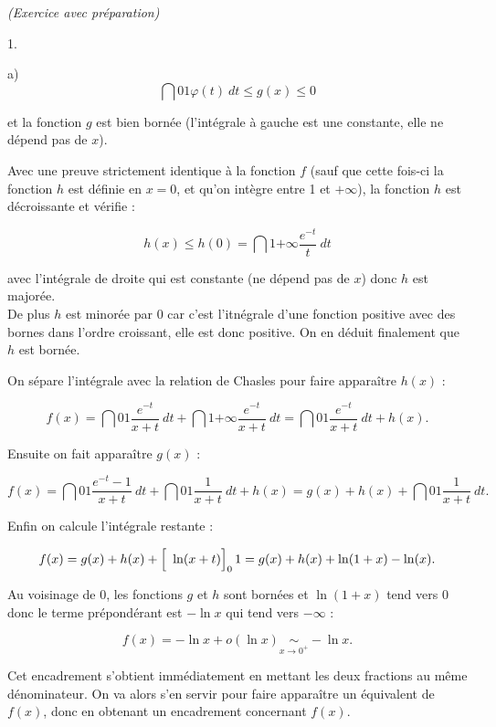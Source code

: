 \documentclass[11pt]{article}%
\begin{document}
\begin{exercice}{\it (Exercice avec préparation)}
\begin{noliste}{1.}
\begin{noliste}{a)}
\[
 \dint{0}{1} \varphi (t) \ dt \leq g(x) \leq 0 
\]

 et la fonction $g$ est bien bornée (l'intégrale à gauche est une
constante, elle ne dépend pas de $x$). \\

 \item Avec une preuve strictement identique à la fonction $f$ (sauf
que cette fois-ci la fonction $h$ est définie en $x = 0$, et qu'on
intègre entre 1 et $ + \infty$), la fonction $h$ est décroissante et
vérifie : 
 
\[
 h(x) \leq h(0) = \dint{1}{+ \infty} \frac{ e^{ - t } }{ t } \ dt 
\]

 avec l'intégrale de droite qui est constante (ne dépend pas de $x$)
donc $h$ est majorée. \\

 De plus $h$ est minorée par 0 car c'est l'itnégrale d'une fonction
positive avec des bornes dans l'ordre croissant, elle est donc
positive. On en déduit finalement que $h$ est bornée. \\

 \item On sépare l'intégrale avec la relation de Chasles pour faire
apparaître $h(x)$ : 
 
\[
 f(x) = \dint{0}{1} \frac{ e^{ - t } }{ x + t } \ dt + \dint{1}{+
\infty} \frac{ e^{ -t } }{ x + t } \ dt = \dint{0}{1} \frac{ e^{ - t }
}{ x + t } \ dt + h(x). 
\]

 Ensuite on fait apparaître $g(x)$ : 
 
\[
 f(x) = \dint{0}{1} \frac{ e^{-t} - 1 }{ x + t } \ dt + \dint{0}{1}
\frac{ 1 }{ x + t } \ dt + h(x) = g(x) + h(x) + \dint{0}{1} \frac{ 1 }{
x + t } \ dt. 
\]

 Enfin on calcule l'intégrale restante : 
 
\[
 f(x) = g(x) + h(x) + \left[ \ \rule{0cm}{0.4cm} \ln (x + t)
\right]_{0}{1} = g(x) + h(x) + \ln (1 + x ) - \ln (x). 
\]

 Au voisinage de 0, les fonctions $g$ et $h$ sont bornées et $\ln (1 +
x)$ tend vers 0 donc le terme prépondérant est $- \ln x$ qui tend vers
$-\infty$ : 
 
\[
 f(x) = - \ln x + o ( \ln x ) \underset{ x \rightarrow 0^+ }{ \sim } -
\ln x. 
\]

 \end{noliste}

 \item Cet encadrement s'obtient immédiatement en mettant les deux
fractions au même dénominateur. On va alors s'en servir pour faire
apparaître un équivalent de $f(x)$, donc en obtenant un encadrement
concernant $f(x)$. \\


\end{noliste}
\end{exercice}
\end{document}
